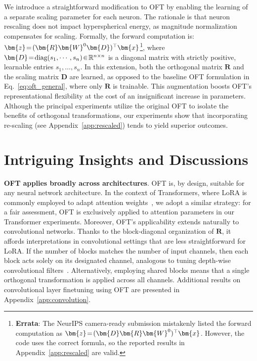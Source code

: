 We introduce a straightforward modification to OFT by enabling the learning of a separate scaling parameter for each neuron. The rationale is that neuron rescaling does not impact hyperspherical energy, as magnitude normalization compensates for scaling. Formally, the forward computation is: $\thickmuskip=2mu \medmuskip=2mu\bm{z}=(\bm{R}\bm{W}^0\bm{D})^\top\bm{x}$\footnote{\textbf{Errata}: The NeurIPS camera-ready submission mistakenly listed the forward computation as $\thickmuskip=2mu \medmuskip=2mu\bm{z}=(\bm{D}\bm{R}\bm{W}^0)^\top\bm{x}$. However, the code uses the correct formula, so the reported results in Appendix~\ref{app:rescaled} are valid.}, where $\thickmuskip=2mu \medmuskip=2mu \bm{D}=\text{diag}(s_1,\cdots,s_n)\in\mathbb{R}^{n\times n}$ is a diagonal matrix with strictly positive, learnable entries $s_1,\ldots,s_n$. In this extension, both the orthogonal matrix $\bm{R}$ and the scaling matrix $\bm{D}$ are learned, as opposed to the baseline OFT formulation in Eq.~\eqref{eq:oft_general}, where only $\bm{R}$ is trainable. This augmentation boosts OFT's representational flexibility at the cost of an insignificant increase in parameters. Although the principal experiments utilize the original OFT to isolate the benefits of orthogonal transformations, our experiments show that incorporating re-scaling (see Appendix~\ref{app:rescaled}) tends to yield superior outcomes.

\section{Intriguing Insights and Discussions}

\textbf{OFT applies broadly across architectures}. OFT is, by design, suitable for any neural network architecture. In the context of Transformers, where LoRA is commonly employed to adapt attention weights~\cite{hulora2022}, we adopt a similar strategy: for a fair assessment, OFT is exclusively applied to attention parameters in our Transformer experiments. Moreover, OFT’s applicability extends naturally to convolutional networks. Thanks to the block-diagonal organization of $\bm{R}$, it affords interpretations in convolutional settings that are less straightforward for LoRA. If the number of blocks matches the number of input channels, then each block acts solely on its designated channel, analogous to tuning depth-wise convolutional filters~\cite{chollet2017xception}. Alternatively, employing shared blocks means that a single orthogonal transformation is applied across all channels. Additional results on convolutional layer finetuning using OFT are presented in Appendix~\ref{app:convolution}.


